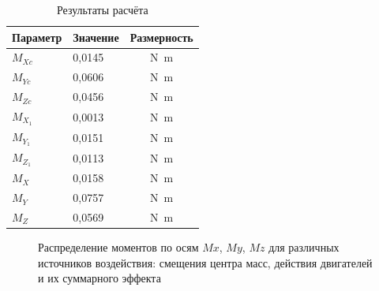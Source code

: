 \begin{table}
	\centering
	\begin{threeparttable}
		\caption{Результаты расчёта}
		\label{tab:unit:resultData}
		\begin{tabular}{llc}
			\toprule
			Параметр             		& Значение              & Размерность             		\\
			\midrule
			$M_{Xc}$       				& 0,0145      			& \si{\newton\metre}      			\\
			$M_{Yc}$         			& 0,0606           		& \si{\newton\metre}          	\\
			$M_{Zc}$            		& 0,0456          		& \si{\newton\metre}           				\\
			$M_{X_1}$                   & 0,0013           		& \si{\newton\metre}            		\\
			$M_{Y_1}$            		& 0,0151      			& \si{\newton\metre}       \\
			$M_{Z_1}$            		& 0,0113      			& \si{\newton\metre}      \\
			$M_X$            			& 0,0158          		& \si{\newton\metre}    \\
			$M_Y$                		& 0,0757          		& \si{\newton\metre}          \\
			$M_Z$                		& 0,0569  				& \si{\newton\metre}   \\
			
			\bottomrule
		\end{tabular}
	\end{threeparttable}
\end{table}


\begin{figure}[ht]
	
	\caption{Распределение моментов по осям $Mx$, $My$, $Mz$ для различных источников воздействия: смещения центра масс, действия двигателей и их суммарного эффекта}
	\label{fig:momentBars}
\end{figure}

